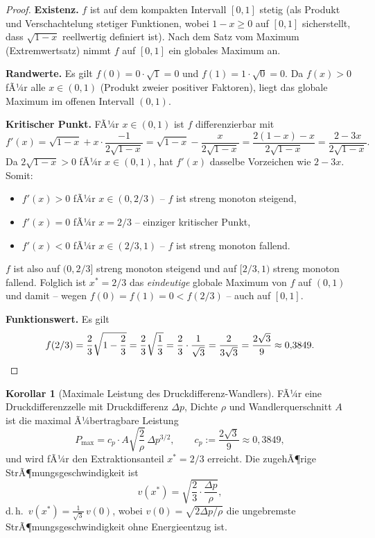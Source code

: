 ﻿\documentclass[a4paper,12pt]{article}
\theoremstyle{definition}
\newtheorem{korollar}{Korollar}
\begin{document}
\begin{proof}
	\textbf{Existenz.} $f$ ist auf dem kompakten Intervall $[0,1]$ stetig
	(als Produkt und Verschachtelung stetiger Funktionen, wobei
	$1-x \geq 0$ auf $[0,1]$ sicherstellt, dass $\sqrt{1-x}$ reellwertig
	definiert ist). Nach dem Satz vom Maximum (Extremwertsatz) nimmt $f$
	auf $[0,1]$ ein globales Maximum an.

	\textbf{Randwerte.} Es gilt $f(0) = 0 \cdot \sqrt{1} = 0$ und
	$f(1) = 1 \cdot \sqrt{0} = 0$. Da $f(x) > 0$ fÃ¼r alle $x \in (0,1)$
	(Produkt zweier positiver Faktoren), liegt das globale Maximum im
	offenen Intervall $(0,1)$.

	\textbf{Kritischer Punkt.} FÃ¼r $x \in (0,1)$ ist $f$ differenzierbar
	mit
	\[
		f'(x) = \sqrt{1-x} + x \cdot \frac{-1}{2\sqrt{1-x}}
		= \sqrt{1-x} - \frac{x}{2\sqrt{1-x}}
		= \frac{2(1-x) - x}{2\sqrt{1-x}}
		= \frac{2 - 3x}{2\sqrt{1-x}}.
	\]
	Da $2\sqrt{1-x} > 0$ fÃ¼r $x \in (0,1)$, hat $f'(x)$ dasselbe
	Vorzeichen wie $2-3x$. Somit:
	\begin{itemize}
		\item $f'(x) > 0$ fÃ¼r $x \in (0, 2/3)$ -- $f$ ist streng
		monoton steigend,
		\item $f'(x) = 0$ fÃ¼r $x = 2/3$ -- einziger kritischer Punkt,
		\item $f'(x) < 0$ fÃ¼r $x \in (2/3, 1)$ -- $f$ ist streng
		monoton fallend.
	\end{itemize}
	$f$ ist also auf $(0, 2/3]$ streng monoton steigend und auf
	$[2/3, 1)$ streng monoton fallend. Folglich ist $x^\ast = 2/3$ das
	\emph{eindeutige} globale Maximum von $f$ auf $(0,1)$ und damit --
	wegen $f(0)=f(1)=0 < f(2/3)$ -- auch auf $[0,1]$.

	\textbf{Funktionswert.} Es gilt
	\[
		f(2/3) = \frac{2}{3}\sqrt{1 - \frac{2}{3}}
		= \frac{2}{3}\sqrt{\frac{1}{3}}
		= \frac{2}{3} \cdot \frac{1}{\sqrt{3}}
		= \frac{2}{3\sqrt{3}}
		= \frac{2\sqrt{3}}{9} \approx 0{,}3849. \qedhere
	\]
\end{proof}

\begin{korollar}[Maximale Leistung des Druckdifferenz-Wandlers]
	\label{kor:pmax}
	FÃ¼r eine Druckdifferenzzelle mit Druckdifferenz $\Delta p$, Dichte
	$\rho$ und Wandlerquerschnitt $A$ ist die maximal Ã¼bertragbare
	Leistung
	\begin{equation}
		\label{eq:pmax}
		P_{\max} = c_p \cdot A \sqrt{\frac{2}{\rho}}\, \Delta p^{3/2},
		\qquad c_p := \frac{2\sqrt{3}}{9} \approx 0{,}3849,
	\end{equation}
	und wird fÃ¼r den Extraktionsanteil $x^\ast = 2/3$ erreicht. Die
	zugehÃ¶rige StrÃ¶mungsgeschwindigkeit ist
	\[
		v(x^\ast) = \sqrt{\frac{2}{3}\cdot\frac{\Delta p}{\rho}},
	\]
	d.\,h.\ $v(x^\ast) = \tfrac{1}{\sqrt{3}}\, v(0)$, wobei
	$v(0) = \sqrt{2\Delta p/\rho}$ die ungebremste
	StrÃ¶mungsgeschwindigkeit ohne Energieentzug ist.
\end{korollar}
\end{document}
